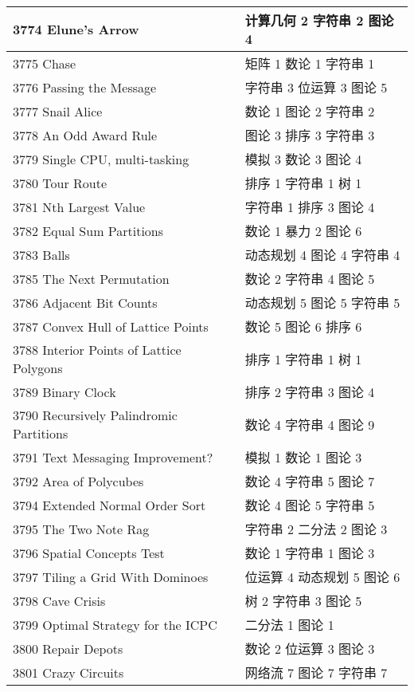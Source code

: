 \begin{longtable}{| p{} | p{} |}
 3774 Elune’s Arrow  & 计算几何 2 字符串 2 图论 4 \\ \hline
 3775 Chase  & 矩阵 1 数论 1 字符串 1 \\ \hline
 3776 Passing the Message  & 字符串 3 位运算 3 图论 5 \\ \hline
 3777 Snail Alice  & 数论 1 图论 2 字符串 2 \\ \hline
 3778 An Odd Award Rule  & 图论 3 排序 3 字符串 3 \\ \hline
 3779 Single CPU, multi-tasking  & 模拟 3 数论 3 图论 4 \\ \hline
 3780 Tour Route  & 排序 1 字符串 1 树 1 \\ \hline
 3781 Nth Largest Value  & 字符串 1 排序 3 图论 4 \\ \hline
 3782 Equal Sum Partitions  & 数论 1 暴力 2 图论 6 \\ \hline
 3783 Balls  & 动态规划 4 图论 4 字符串 4 \\ \hline
 3785 The Next Permutation  & 数论 2 字符串 4 图论 5 \\ \hline
 3786 Adjacent Bit Counts  & 动态规划 5 图论 5 字符串 5 \\ \hline
 3787 Convex Hull of Lattice Points  & 数论 5 图论 6 排序 6 \\ \hline
 3788 Interior Points of Lattice Polygons  & 排序 1 字符串 1 树 1 \\ \hline
 3789 Binary Clock  & 排序 2 字符串 3 图论 4 \\ \hline
 3790 Recursively Palindromic Partitions  & 数论 4 字符串 4 图论 9 \\ \hline
 3791 Text Messaging Improvement?  & 模拟 1 数论 1 图论 3 \\ \hline
 3792 Area of Polycubes  & 数论 4 字符串 5 图论 7 \\ \hline
 3794 Extended Normal Order Sort  & 数论 4 图论 5 字符串 5 \\ \hline
 3795 The Two Note Rag  & 字符串 2 二分法 2 图论 3 \\ \hline
 3796 Spatial Concepts Test  & 数论 1 字符串 1 图论 3 \\ \hline
 3797 Tiling a Grid With Dominoes  & 位运算 4 动态规划 5 图论 6 \\ \hline
 3798 Cave Crisis  & 树 2 字符串 3 图论 5 \\ \hline
 3799 Optimal Strategy for the ICPC  & 二分法 1 图论 1 \\ \hline
 3800 Repair Depots  & 数论 2 位运算 3 图论 3 \\ \hline
 3801 Crazy Circuits  & 网络流 7 图论 7 字符串 7 \\ \hline

\end{longtable}
